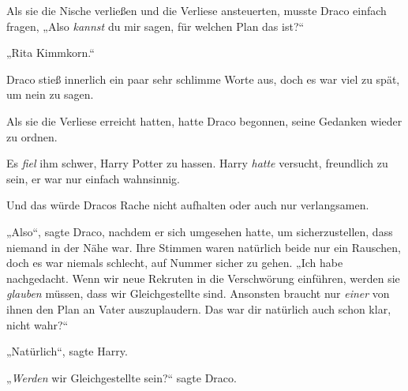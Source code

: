 Als sie die Nische verließen und die Verliese ansteuerten, musste Draco einfach fragen,
„Also \emph{kannst} du mir sagen, für welchen Plan das ist?“

„Rita Kimmkorn.“

Draco stieß innerlich ein paar sehr schlimme Worte aus, doch es war viel zu spät, um nein zu sagen.

\later

Als sie die Verliese erreicht hatten, hatte Draco begonnen, seine Gedanken wieder zu ordnen.

Es \emph{fiel} ihm schwer, Harry Potter zu hassen. Harry \emph{hatte} versucht, freundlich zu sein, er war nur einfach wahnsinnig.

Und das würde Dracos Rache nicht aufhalten oder auch nur verlangsamen.

„Also“, sagte Draco, nachdem er sich umgesehen hatte, um sicherzustellen, dass niemand in der Nähe war. Ihre Stimmen waren natürlich beide nur ein Rauschen, doch es war niemals schlecht, auf Nummer sicher zu gehen.
„Ich habe nachgedacht. Wenn wir neue Rekruten in die Verschwörung einführen, werden sie \emph{glauben} müssen, dass wir Gleichgestellte sind. Ansonsten braucht nur \emph{einer} von ihnen den Plan an Vater auszuplaudern. Das war dir natürlich auch schon klar, nicht wahr?“

„Natürlich“, sagte Harry.

„\emph{Werden} wir Gleichgestellte sein?“ sagte Draco.

